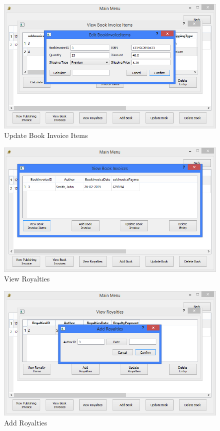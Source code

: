 \begin{figure}[H]
    \caption{Update Book Invoice Items} \label{fig:UpdateBookInvoiceItems}
    \includegraphics[width=\textwidth]{./Maintenance/UserInterface/UpdateBookInvoiceItems.png}
\end{figure}

\begin{figure}[H]
    \caption{View Royalties} \label{fig:ViewRoyalties}
    \includegraphics[width=\textwidth]{./Maintenance/UserInterface/ViewBookInvoices.png}
\end{figure}

\begin{figure}[H]
    \caption{Add Royalties} \label{fig:AddRoyalties}
    \includegraphics[width=\textwidth]{./Maintenance/UserInterface/AddRoyalties.png}
\end{figure}

